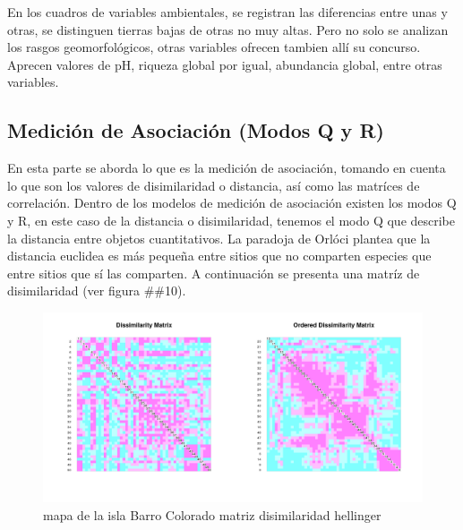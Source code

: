 \documentclass[11pt,]{article}
\begin{document}
En los cuadros de variables ambientales, se registran las diferencias
entre unas y otras, se distinguen tierras bajas de otras no muy altas.
Pero no solo se analizan los rasgos geomorfológicos, otras variables
ofrecen tambien allí su concurso. Aprecen valores de pH, riqueza global
por igual, abundancia global, entre otras variables.

\subsection{Medición de Asociación (Modos Q y
R)}\label{mediciuxf3n-de-asociaciuxf3n-modos-q-y-r}

En esta parte se aborda lo que es la medición de asociación, tomando en
cuenta lo que son los valores de disimilaridad o distancia, así como las
matríces de correlación. Dentro de los modelos de medición de asociación
existen los modos Q y R, en este caso de la distancia o disimilaridad,
tenemos el modo Q que describe la distancia entre objetos cuantitativos.
La paradoja de Orlóci plantea que la distancia euclidea es más pequeña
entre sitios que no comparten especies que entre sitios que sí las
comparten. A continuación se presenta una matríz de disimilaridad (ver
figura \#\#10).

\begin{figure}
\centering
\includegraphics[width=1.00000\textwidth]{matriz_disimilaridad_hellinger.png}
\caption{mapa de la isla Barro Colorado matriz disimilaridad hellinger
\label{fig:bci_map}}
\end{figure}
\end{document}
